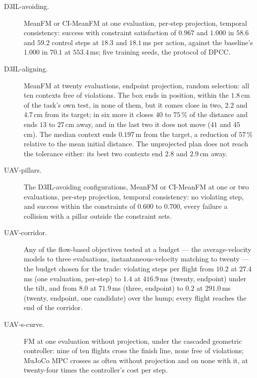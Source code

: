 \begin{description}
  \item[D3IL-avoiding.] MeanFM or CI-MeanFM at one evaluation, per-step projection, temporal consistency:
    success with constraint satisfaction of $0.967$ and $1.000$ in $58.6$ and $59.2$ control steps at $18.3$
    and $18.1$\,ms per action, against the baseline's $1.000$ in $70.1$ at $553.4$\,ms; five training seeds,
    the protocol of \ac{DPCC}.
  \item[D3IL-aligning.] MeanFM at twenty evaluations, endpoint projection, random selection: all ten contexts
    free of violations. The box ends in position, within the $1.8$\,cm of the task's own test, in none of
    them, but it comes close in two, $2.2$ and $4.7$\,cm from its target; in six more it closes $40$ to
    $75\,\%$ of the distance and ends $13$ to $27$\,cm away, and in the last two it does not move ($41$ and
    $45$\,cm). The median context ends $0.197$\,m from the target, a reduction of $57\,\%$ relative to the mean initial
    distance.
    The unprojected plan does not reach the tolerance either: its best two contexts end $2.8$ and $2.9$\,cm
    away.
  \item[UAV-pillars.] The D3IL-avoiding configurations, MeanFM or CI-MeanFM at one or two evaluations,
    per-step projection, temporal consistency: no violating step, and success within the constraints of
    $0.600$ to $0.700$, every failure a collision with a pillar outside the constraint sets.
  \item[UAV-corridor.] Any of the flow-based objectives tested at a budget --- the average-velocity models to
    three evaluations, instantaneous-velocity matching to twenty --- the budget chosen for the trade:
    violating steps per flight
    from $10.2$ at $27.4$\,ms (one evaluation, per-step) to $1.4$ at $416.9$\,ms (twenty, endpoint) under the
    tilt, and from $8.0$ at $71.9$\,ms (three, endpoint) to $0.2$ at $291.0$\,ms (twenty, endpoint, one
    candidate) over the hump; every flight reaches the end of the corridor.
  \item[UAV-s-curve.] FM at one evaluation without projection, under the cascaded geometric controller: nine
    of ten flights cross the finish line, none free of violations; MuJoCo MPC crosses as often without
    projection and on none with it, at twenty-four times the controller's cost per step.
\end{description}
